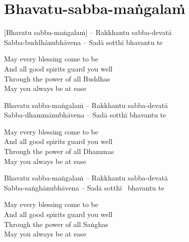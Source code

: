 \suttaRef{[Dhp 41]}

\section{Bhavatu-sabba-maṅgalaṁ}
\label{bhavatu}

\vspace{-0.8em}

[Bhavatu sabba-maṅgalaṁ] – Rakkhantu sabba-devatā\\
Sabba-buddhānubhāvena – Sadā sotthī bhavantu te

\begin{english-verses}
  May every blessing come to be\\
  And all good spirits guard you well\\
  Through the power of all Buddhas\\
  May you always be at ease
\end{english-verses}

Bhavatu sabba-maṅgalaṁ – Rakkhantu sabba-devatā\\
Sabba-dhammānubhāvena – Sadā sotthī bhavantu te

\begin{english-verses}
  May every blessing come to be\\
  And all good spirits guard you well\\
  Through the power of all Dhammas\\
  May you always be at ease
\end{english-verses}

Bhavatu sabba-maṅgalaṁ – Rakkhantu sabba-devatā\\
Sabba-saṅghānubhāvena – Sadā sotthī \breathmark\ bhavantu te

\begin{english-verses}
  May every blessing come to be\\
  And all good spirits guard you well\\
  Through the power of all Saṅghas\\
  May you always be at ease
\end{english-verses}

\suttaRef{[Trad]}

